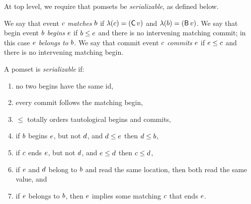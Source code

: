At top level, we require that pomsets be \emph{serializable}, as defined below.
\begin{definition}
  We say that event $c$ \emph{matches} $b$ if
  $\labelling(\comEv)=(\DC{\aVal})$ and
  $\labelling(\begEv)=(\DB{\aVal})$. %
  We say that begin event $b$ \emph{begins} $e$ if
  $b\le e$ and there is no intervening matching commit; in this case
  $e$ \emph{belongs to} $b$.
  We say that commit event $c$ \emph{commits} $e$ if $e\le c$
  and there is no intervening matching begin.
\end{definition}
\begin{definition}
  A pomset is \emph{serializable} if:
  \begin{enumerate}
  \item\label{tx:1} no two begins have the same id,
  \item\label{tx:2} every commit follows the matching begin,
  \item\label{tx:3} $\le$ totally orders tautological begins and commits,
  \item\label{tx:4} if $b$ begins $e$, but not $d$, and $d\le e$ then $d\le b$,
  \item\label{tx:5} if $c$ ends $e$, but not $d$, and $e\le d$ then $c\le d$,
  \item\label{tx:6} if $e$ and $d$ belong to $b$ and read the same
    location, then both read the same value, and
  \item\label{tx:7} if $e$ belongs to $b$, then $e$ implies some
    matching $c$ that ends $e$.
  \end{enumerate}
\end{definition}
